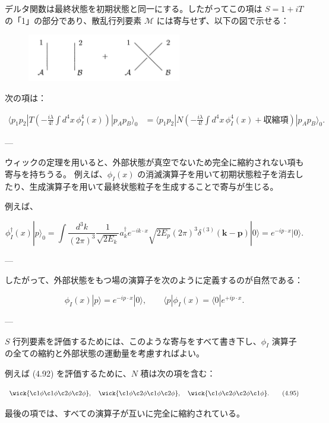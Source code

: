 \documentclass[a4paper,12pt]{article}
\begin{document}
デルタ関数は最終状態を初期状態と同一にする。したがってこの項は $S=1+iT$ の「1」の部分であり、散乱行列要素 $\mathcal{M}$ には寄与せず、以下の図で示せる：

\begin{figure}[H]
    \centering\includegraphics[width=0.6\textwidth]{figures/4.91a.png}
\end{figure}

次の項は：

\begin{align}
\langle p_1 p_2| T\!\left(-\frac{i\lambda}{4!} \int d^4x \, \phi_I^4(x)\right) |p_A p_B\rangle_0
&= \langle p_1 p_2| N\!\left(-\frac{i\lambda}{4!} \int d^4x \, \phi_I^4(x) + \text{収縮項}\right)|p_A p_B\rangle_0.
\tag{4.92}
\end{align}

---

ウィックの定理を用いると、外部状態が真空でないため完全に縮約されない項も寄与を持ちうる。  
例えば、$\phi_I(x)$ の消滅演算子を用いて初期状態粒子を消去したり、生成演算子を用いて最終状態粒子を生成することで寄与が生じる。  

例えば、

\begin{equation}
\phi_I^\dagger(x)|p\rangle_0
= \int \frac{d^3k}{(2\pi)^3} \frac{1}{\sqrt{2E_k}} a_k^\dagger e^{-ik\cdot x} \sqrt{2E_p} (2\pi)^3 \delta^{(3)}(\mathbf{k}-\mathbf{p})|0\rangle
= e^{-ip\cdot x}|0\rangle.
\tag{4.93}
\end{equation}

---

したがって、外部状態をもつ場の演算子を次のように定義するのが自然である：

\begin{equation}
\phi_I(x)|p\rangle = e^{-ip\cdot x}|0\rangle, 
\qquad
\langle p|\phi_I(x) = \langle 0| e^{+ip\cdot x}.
\tag{4.94}
\end{equation}

---

$S$ 行列要素を評価するためには、このような寄与をすべて書き下し、$\phi_I$ 演算子の全ての縮約と外部状態の運動量を考慮すればよい。  

例えば (4.92) を評価するために、$N$ 積は次の項を含む：

\begin{equation}
\wick{\c1 \phi \c1 \phi \c2 \phi \c2 \phi}, \quad
\wick{\c1 \phi \c2 \phi \c1 \phi \c2 \phi}, \quad
\wick{\c1 \phi \c2 \phi \c2 \phi \c1 \phi}.
\tag{4.95}
\end{equation}

最後の項では、すべての演算子が互いに完全に縮約されている。
\end{document}
